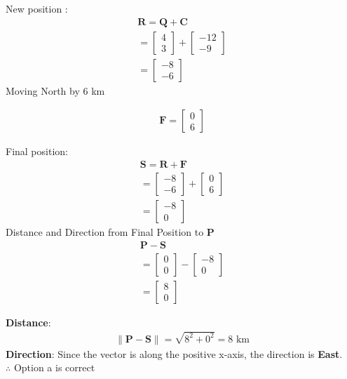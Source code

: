 \documentclass{beamer}
\begin{document}
\begin{frame}
New position :
\begin{align}
\mathbf{R} = \mathbf{Q} + \mathbf{C} \\
= \begin{bmatrix} 4 \\ 3 \end{bmatrix} + \begin{bmatrix} -12 \\ -9 \end{bmatrix} \\
= \begin{bmatrix} -8 \\ -6 \end{bmatrix}
\end{align}
Moving North by 6 km

\begin{align}
\mathbf{F} = \begin{bmatrix} 0 \\ 6 \end{bmatrix}
\end{align}
\end{frame}

\begin{frame}
Final position:
\begin{align}
\mathbf{S} = \mathbf{R} + \mathbf{F} \\
= \begin{bmatrix} -8 \\ -6 \end{bmatrix} + \begin{bmatrix} 0 \\ 6 \end{bmatrix} \\
=\begin{bmatrix} -8 \\ 0 \end{bmatrix}
\end{align}
Distance and Direction from Final Position to $\mathbf{P}$
\begin{align}
\mathbf{P} - \mathbf{S} \\
= \begin{bmatrix} 0 \\ 0 \end{bmatrix} - \begin{bmatrix} -8 \\ 0 \end{bmatrix} \\
= \begin{bmatrix} 8 \\ 0 \end{bmatrix}
\end{align}
\end{frame}
\begin{frame}
\textbf{Distance}:
\begin{align}
\|\mathbf{P} - \mathbf{S}\| = \sqrt{8^2 + 0^2} = 8 \text{ km}
\end{align}
\textbf{Direction}: Since the vector is along the positive x-axis, the direction is \textbf{East}.\\
$\therefore$ Option a is correct
\end{frame}
\end{document}
